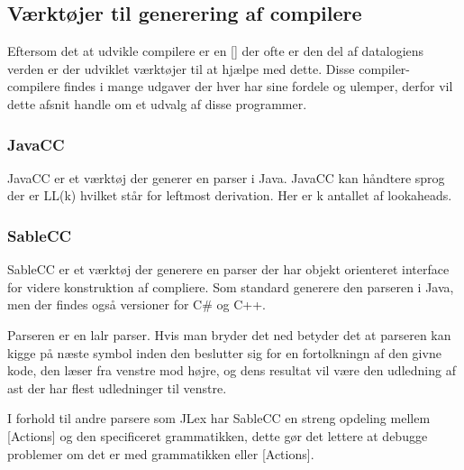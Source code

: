 \subsection{Værktøjer til generering af compilere}
\label{ssec:toolsforcc}

Eftersom det at udvikle compilere er en [] der ofte er den del af datalogiens verden er der udviklet værktøjer til at hjælpe med dette. Disse compiler-compilere findes i mange udgaver der hver har sine fordele og ulemper, derfor vil dette afsnit handle om et udvalg af disse programmer.

\subsubsection{JavaCC}
JavaCC er et værktøj der generer en parser i Java. JavaCC kan håndtere sprog der er LL(k) hvilket står for leftmost derivation. Her er k antallet af lookaheads. 

\subsubsection{SableCC}
SableCC er et værktøj der generere en parser der har objekt orienteret interface for videre konstruktion af compliere. Som standard generere den parseren i Java, men der findes også versioner for C\# og C++. 
    
    
Parseren er en \gls{lalr} parser. Hvis man bryder det ned betyder det at parseren kan kigge på næste symbol inden den beslutter sig for en fortolkningn af den givne kode, den læser fra venstre mod højre, og dens resultat vil være den udledning af \gls{ast} der har flest udledninger til venstre.
    
I forhold til andre parsere som JLex har SableCC en streng opdeling mellem [Actions] og den specificeret grammatikken, dette gør det lettere at debugge problemer om det er med grammatikken eller [Actions].
